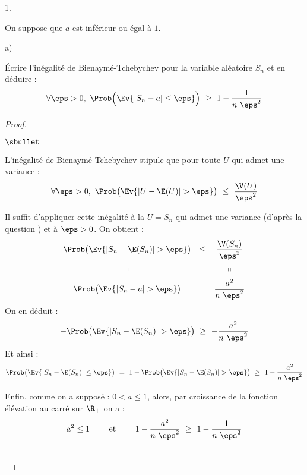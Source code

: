 \documentclass[11pt]{article}%
\begin{document}
\begin{noliste}{1.}
\item On suppose que $a$ est inférieur ou égal à $1$.
  \begin{noliste}{a)}
    \setlength{\itemsep}{2mm}
  \item Écrire l'inégalité de Bienaymé-Tchebychev pour la variable
    aléatoire $S_n$ et en déduire :
    \[
    \forall \eps > 0, \ \Prob\Big(\Ev{|S_n - a| \leq \eps} \Big) \
    \geq \ 1 - \dfrac{1}{n \ \eps^2}
    \]
    
    \begin{proof}~%
      \begin{noliste}{$\sbullet$}
      \item L'inégalité de Bienaymé-Tchebychev stipule que pour toute
        \var $U$ qui admet une variance :
        \[
        \forall \eps > 0, \ \Prob\big( \Ev{|U - \E(U)| > \eps}
        \big) \ \leq \ \dfrac{\V(U)}{\eps^2}
        \]
        

      \item Il suffit d'appliquer cette inégalité à la \var $U = S_n$
        qui admet une variance (d'après la question \itbf{6.c)}) et à
        $\eps > 0$. On obtient :
        \[
        \begin{array}{cccc}
          \Prob\big( \Ev{|S_n - \E(S_n)| > \eps} \big) & \leq &
          \dfrac{\V(S_n)}{\eps^2} 
          \\[.4cm]
          \shortparallel & & \shortparallel
          \\[.2cm]
          \Prob\big( \Ev{|S_n - a| > \eps} \big) & &
          \dfrac{a^2}{n \ \eps^2}        
        \end{array}        
        \]
        On en déduit :
        \[
        - \Prob\big( \Ev{|S_n - \E(S_n)| > \eps} \big) \ \geq \ -
        \dfrac{a^2}{n \ \eps^2}
        \]
        Et ainsi :
        \[
        \Prob\big( \Ev{|S_n - \E(S_n)| \leq \eps} \big) \ = \ 1 -
        \Prob\big( \Ev{|S_n - \E(S_n)| > \eps} \big) \ \geq \ 1 -
        \dfrac{a^2}{n \ \eps^2}
        \]
        
      \item Enfin, comme on a supposé : $0 < a \leq 1$, alors, par
        croissance de la fonction élévation au carré sur $\R_+$ on a :
        \[
        a^2 \leq 1 \qquad \text{ et } \qquad 1 - \dfrac{a^2}{n \
          \eps^2} \ \geq \ 1 - \dfrac{1}{n \ \eps^2}
        \]
      \end{noliste}
      ~\\[-1cm] 
    \end{proof}
    


\end{noliste}
\end{noliste}
\end{document}
